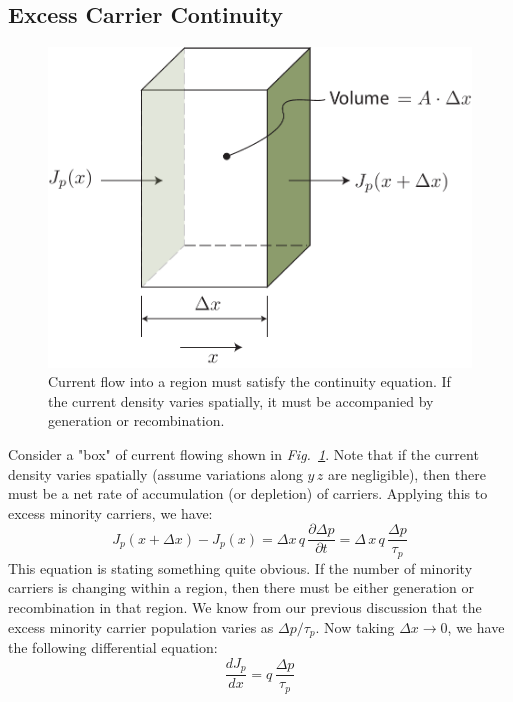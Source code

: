 \subsection{Excess Carrier Continuity}
\begin{figure}[t]
\centering
\includegraphics[width=.65\columnwidth]{Jbox}
\caption{Current flow into a region must satisfy the continuity equation.  If the current density varies spatially, it must be accompanied by generation or recombination.}
\label{fig:Jbox}
\end{figure}
Consider a "box" of current flowing shown in \emph{Fig.~\ref{fig:Jbox}}.  Note that if the current density varies spatially (assume variations along $y\,z$ are negligible), then there must be a net rate of accumulation (or depletion) of carriers.  Applying this to excess minority carriers, we have:
    \begin{equation}
        J_p(x + \Delta x) - J_p(x) = \Delta x\,q\,\frac{\partial \Delta p}{\partial t} = \Delta\,x\,q\,\frac{\Delta p}{\tau_p}
    \end{equation}
This equation is stating something quite obvious.  If the number of minority carriers is changing within a region, then there must be either generation or recombination in that region.  We know from our previous discussion that the excess minority carrier population varies as $\Delta p/\tau_p$.  Now taking $\Delta x \rightarrow 0$, we have the following differential equation:
    \begin{equation}
        \frac{dJ_p}{dx} = q\,\frac{\Delta p}{\tau_p}
    \end{equation}
